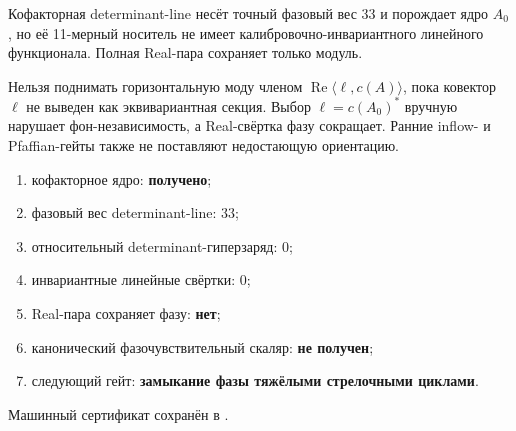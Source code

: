 \begin{theorem}
Кофакторная determinant-line несёт точный фазовый вес $33$ и порождает
ядро $A_0$, но её 11-мерный носитель не имеет калибровочно-инвариантного
линейного функционала. Полная Real-пара сохраняет только модуль.
\end{theorem}

\begin{nogocriterion}
Нельзя поднимать горизонтальную моду членом
$\operatorname{Re}\langle\ell,c(A)\rangle$, пока ковектор $\ell$ не
выведен как эквивариантная секция. Выбор $\ell=c(A_0)^*$ вручную нарушает
фон-независимость, а Real-свёртка фазу сокращает. Ранние inflow- и
Pfaffian-гейты также не поставляют недостающую ориентацию.
\end{nogocriterion}

\begin{protocol}
\begin{enumerate}
 \item кофакторное ядро: \textbf{получено};
 \item фазовый вес determinant-line: \textbf{$33$};
 \item относительный determinant-гиперзаряд: \textbf{$0$};
 \item инвариантные линейные свёртки: \textbf{$0$};
 \item Real-пара сохраняет фазу: \textbf{нет};
 \item канонический фазочувствительный скаляр: \textbf{не получен};
 \item следующий гейт: \textbf{замыкание фазы тяжёлыми стрелочными циклами}.
\end{enumerate}
\end{protocol}

Машинный сертификат сохранён в
.